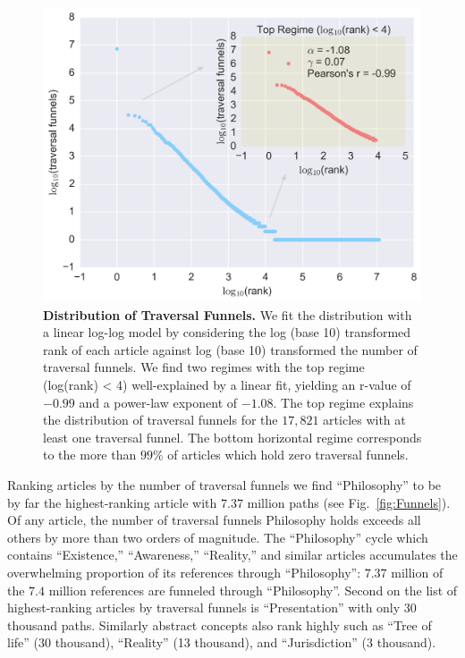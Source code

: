 \documentclass[pre,twocolumn,twoside,superscriptaddress,floatfix, aps, 10pt]{revtex4-1}
\begin{document}
\begin{figure}[tp!]
  \includegraphics[width=\columnwidth]{graphics/funnels_distribution.png}
  \caption{
    \textbf{Distribution of Traversal Funnels.}
We fit the distribution with a linear log-log model by considering the log (base 10) transformed rank of each article against log (base 10) transformed the number of traversal funnels. 
We find two regimes with the top regime (log(rank) < 4) 
well-explained by a linear fit, yielding an r-value of $-0.99$ and a 
power-law exponent of $-1.08$. The top regime 
explains the distribution of traversal funnels for the $17, 821$ 
articles with at least one traversal funnel. The bottom 
horizontal regime corresponds to the more than $99\%$ of articles
which hold zero traversal funnels.}
  \label{fig:Funnels Distribution}
\end{figure}
Ranking articles by the number of traversal funnels we find 
``Philosophy'' to be by far the highest-ranking article with 
$7.37$ million paths
(see Fig.~\ref{fig:Funnels}).
Of any article, the number of traversal funnels Philosophy holds exceeds 
all others by more than two orders of magnitude.
The ``Philosophy'' cycle which contains ``Existence,'' ``Awareness,'' ``Reality,'' 
and similar articles accumulates the overwhelming proportion of its 
references through ``Philosophy'': $7.37$ million of the $7.4$ million references
are funneled through ``Philosophy''.
Second on the list of highest-ranking articles by traversal funnels is 
``Presentation'' with only $30$ thousand paths. Similarly abstract 
concepts also rank highly such as ``Tree of life'' (30 thousand), 
``Reality'' (13 thousand), and ``Jurisdiction'' (3 thousand).
\end{document}
